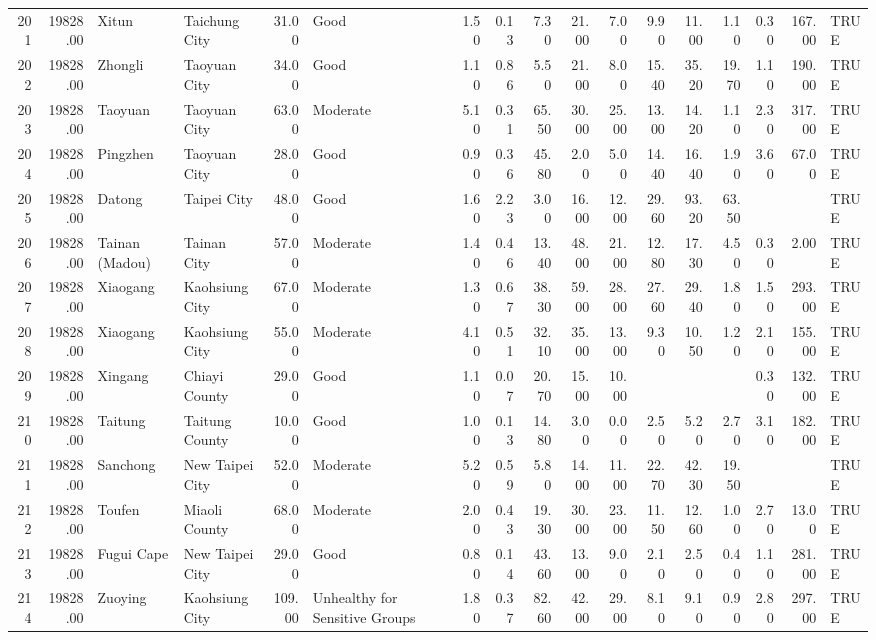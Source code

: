 \begin{table}[ht]
\begin{tabular}{rrllrlrrrrrrrrrrl}
  201 & 19828.00 & Xitun & Taichung City & 31.00 & Good & 1.50 & 0.13 & 7.30 & 21.00 & 7.00 & 9.90 & 11.00 & 1.10 & 0.30 & 167.00 & TRUE \\ 
  202 & 19828.00 & Zhongli & Taoyuan City & 34.00 & Good & 1.10 & 0.86 & 5.50 & 21.00 & 8.00 & 15.40 & 35.20 & 19.70 & 1.10 & 190.00 & TRUE \\ 
  203 & 19828.00 & Taoyuan & Taoyuan City & 63.00 & Moderate & 5.10 & 0.31 & 65.50 & 30.00 & 25.00 & 13.00 & 14.20 & 1.10 & 2.30 & 317.00 & TRUE \\ 
  204 & 19828.00 & Pingzhen & Taoyuan City & 28.00 & Good & 0.90 & 0.36 & 45.80 & 2.00 & 5.00 & 14.40 & 16.40 & 1.90 & 3.60 & 67.00 & TRUE \\ 
  205 & 19828.00 & Datong & Taipei City & 48.00 & Good & 1.60 & 2.23 & 3.00 & 16.00 & 12.00 & 29.60 & 93.20 & 63.50 &  &  & TRUE \\ 
  206 & 19828.00 & Tainan (Madou) & Tainan City & 57.00 & Moderate & 1.40 & 0.46 & 13.40 & 48.00 & 21.00 & 12.80 & 17.30 & 4.50 & 0.30 & 2.00 & TRUE \\ 
  207 & 19828.00 & Xiaogang & Kaohsiung City & 67.00 & Moderate & 1.30 & 0.67 & 38.30 & 59.00 & 28.00 & 27.60 & 29.40 & 1.80 & 1.50 & 293.00 & TRUE \\ 
  208 & 19828.00 & Xiaogang & Kaohsiung City & 55.00 & Moderate & 4.10 & 0.51 & 32.10 & 35.00 & 13.00 & 9.30 & 10.50 & 1.20 & 2.10 & 155.00 & TRUE \\ 
  209 & 19828.00 & Xingang & Chiayi County & 29.00 & Good & 1.10 & 0.07 & 20.70 & 15.00 & 10.00 &  &  &  & 0.30 & 132.00 & TRUE \\ 
  210 & 19828.00 & Taitung & Taitung County & 10.00 & Good & 1.00 & 0.13 & 14.80 & 3.00 & 0.00 & 2.50 & 5.20 & 2.70 & 3.10 & 182.00 & TRUE \\ 
  211 & 19828.00 & Sanchong & New Taipei City & 52.00 & Moderate & 5.20 & 0.59 & 5.80 & 14.00 & 11.00 & 22.70 & 42.30 & 19.50 &  &  & TRUE \\ 
  212 & 19828.00 & Toufen & Miaoli County & 68.00 & Moderate & 2.00 & 0.43 & 19.30 & 30.00 & 23.00 & 11.50 & 12.60 & 1.00 & 2.70 & 13.00 & TRUE \\ 
  213 & 19828.00 & Fugui Cape & New Taipei City & 29.00 & Good & 0.80 & 0.14 & 43.60 & 13.00 & 9.00 & 2.10 & 2.50 & 0.40 & 1.10 & 281.00 & TRUE \\ 
  214 & 19828.00 & Zuoying & Kaohsiung City & 109.00 & Unhealthy for Sensitive Groups & 1.80 & 0.37 & 82.60 & 42.00 & 29.00 & 8.10 & 9.10 & 0.90 & 2.80 & 297.00 & TRUE \\ 

\end{tabular}
\end{table}
